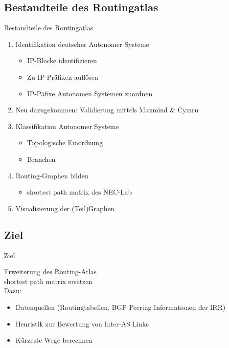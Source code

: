 \documentclass[ngerman,compress,hyperref={bookmarks}]{beamer}
\begin{document}
\subsection{Bestandteile des Routingatlas}
\begin{frame}{Bestandteile des Routingatlas}
  \begin{enumerate}
  \item Identifikation deutscher Autonomer Systeme
  \begin {itemize}
    \item IP-Blöcke identifizieren
    \item Zu IP-Präfixen auflösen
    \item IP-Päfixe Autonomen Systemen zuordnen
  \end{itemize}
  \item Neu dazugekommen: Validierung mittels Maxmind \& Cymru
  \item Klassifikation Autonomer Systeme
  \begin{itemize}
    \item Topologische Einordnung
    \item Branchen
  \end{itemize}
  \item Routing-Graphen bilden
  \begin{itemize}
    \item shortest path matrix des NEC-Lab
  \end{itemize}
  \item Visualisierung der (Teil)Graphen
  \end{enumerate}
\end{frame}

\subsection{Ziel}
\begin{frame}{Ziel}
  \begin{center}
    {\Large Erweiterung des Routing-Atlas}\\
    \vspace{0.5cm}
    shortest path matrix ersetzen\\
    \vspace{0.5cm}
    Dazu:
    \begin{itemize}
      \item Datenquellen (Routingtabellen, BGP Peering Informationen der IRR)
      \item Heuristik zur Bewertung von Inter-AS Links
      \item Kürzeste Wege berechnen
    \end{itemize}
  \end{center}
\end{frame}
\end{document}
